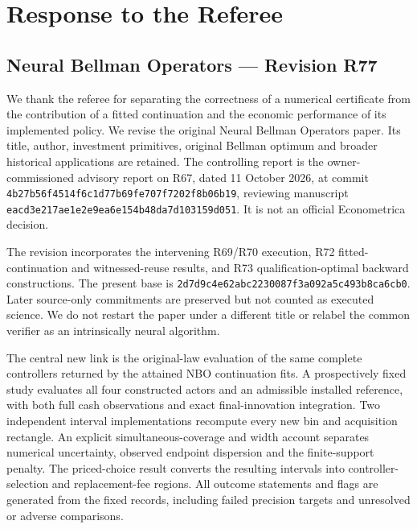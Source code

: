 \hypertarget{response-to-the-referee}{%
\section{Response to the Referee}\label{response-to-the-referee}}

\hypertarget{neural-bellman-operators-revision-r77}{%
\subsection{Neural Bellman Operators --- Revision
R77}\label{neural-bellman-operators-revision-r77}}

We thank the referee for separating the correctness of a numerical
certificate from the contribution of a fitted continuation and the
economic performance of its implemented policy. We revise the original
Neural Bellman Operators paper. Its title, author, investment
primitives, original Bellman optimum and broader historical applications
are retained. The controlling report is the owner-commissioned advisory
report on R67, dated 11 October 2026, at commit
\texttt{4b27b56f4514f6c1d77b69fe707f7202f8b06b19}, reviewing manuscript
\texttt{eacd3e217ae1e2e9ea6e154b48da7d103159d051}. It is not an official
Econometrica decision.

The revision incorporates the intervening R69/R70 execution, R72
fitted-continuation and witnessed-reuse results, and R73
qualification-optimal backward constructions. The present base is
\texttt{2d7d9c4e62abc2230087f3a092a5c493b8ca6cb0}. Later source-only
commitments are preserved but not counted as executed science. We do not
restart the paper under a different title or relabel the common verifier
as an intrinsically neural algorithm.

The central new link is the original-law evaluation of the same complete
controllers returned by the attained NBO continuation fits. A
prospectively fixed study evaluates all four constructed actors and an
admissible installed reference, with both full cash observations and
exact final-innovation integration. Two independent interval
implementations recompute every new bin and acquisition rectangle. An
explicit simultaneous-coverage and width account separates numerical
uncertainty, observed endpoint dispersion and the finite-support
penalty. The priced-choice result converts the resulting intervals into
controller-selection and replacement-fee regions. All outcome statements
and flags are generated from the fixed records, including failed
precision targets and unresolved or adverse comparisons.

